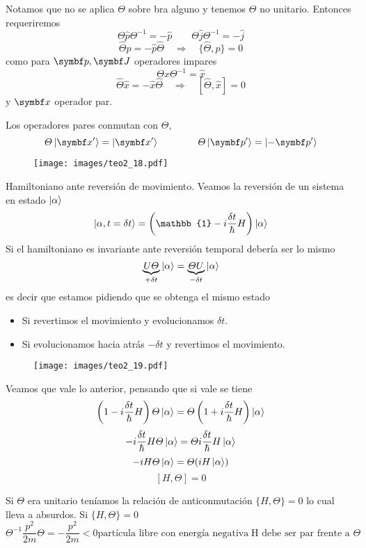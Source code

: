 \documentclass[10pt,oneside]{CBFT_book}
\begin{document}
Notamos que no se aplica $\Theta$ sobre bra alguno y tenemos $\Theta$ no unitario. Entonces requeriremos 
\[
	\Theta \hat{p} \Theta^{-1} = -\hat{p} \qquad \Theta \hat{j} \Theta^{-1} = -\hat{j}
\]
\[
	\hat{\Theta}\hat{p} = -\hat{p}\hat{\Theta} \quad \Rightarrow 
	\quad \{ \hat{\Theta},\hat{p}\} = 0
\]
como para $\vb{p},\vb{J}$ operadores impares 
\[
	\Theta \hat{x} \Theta^{-1} = \hat{x}
\]
\[
	\hat{\Theta}\hat{x} = -\hat{x}\hat{\Theta} \quad \Rightarrow 
	\quad [ \hat{\Theta},\hat{x} ] = 0
\]
y $\vb{x}$ operador par.

Los operadores pares conmutan con $\Theta$,
\[
	\Theta \Ket{\vb{x}'} =  \Ket{\vb{x}'} \qquad \qquad
	\Theta \Ket{\vb{p}'} =  \Ket{-\vb{p}'} 
\]
\begin{figure}[htb]
	\begin{center}
	\texttt{[image: images/teo2\_18.pdf]}
	\end{center}
	\caption{}
\end{figure} 

Hamiltoniano ante reversión de movimiento. Veamos la reversión de un sistema en estado $\Ket{\alpha}$
\[
	\Ket{\alpha, t=\delta t} = \left( \mathbb{1} - i\frac{\delta t}{\hbar} H \right) \Ket{\alpha}
\]
Si el hamiltoniano es invariante ante reversión temporal debería ser lo mismo 
\[
	\underbrace{U \Theta}_{+\delta t} \Ket{\alpha} = \underbrace{\Theta U}_{-\delta t} \Ket{\alpha}
\]
es decir que estamos pidiendo que se obtenga el mismo estado 
\begin{itemize}
 \item Si revertimos el movimiento y evolucionamos $\delta t$.
 \item Si evolucionamos hacia atrás $-\delta t$ y revertimos el movimiento.
\end{itemize}
\begin{figure}[htb]
	\begin{center}
	\texttt{[image: images/teo2\_19.pdf]}
	\end{center}
	\caption{}
\end{figure} 
Veamos que vale lo anterior, pensando que si vale se tiene 
\[
	\left( 1- i\frac{\delta t}{\hbar} H\right) \Theta \Ket{\alpha} =
	\Theta \left( 1 + i\frac{\delta t}{\hbar} H \right) \Ket{\alpha}
\]
\[
	- i\frac{\delta t}{\hbar} H \Theta \Ket{\alpha} =  \Theta
	i\frac{\delta t}{\hbar} H \Ket{\alpha} 
\]
\[
	- i H\Theta \Ket{\alpha} = \Theta (i H \Ket{\alpha} )
\]
\[
	[H,\Theta] = 0
\]

Si $\Theta$ era unitario teníamos la relación de anticonmutación $\{ H, \Theta \}=0$ 
lo cual lleva a absurdos.
Si $\{ H,\Theta \} = 0$
\[
	\Theta^{-1} \frac{p^2}{2m} \Theta = - \frac{p^2}{2m} < 0
	\text{partícula libre con energía negativa} \; \text{H debe ser par frente a $\Theta$}
\]
\end{document}
